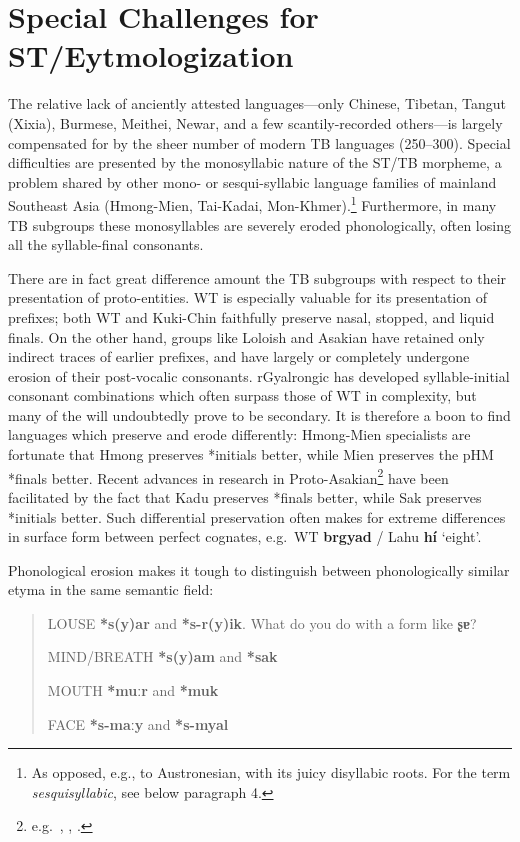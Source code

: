\section{Special Challenges for ST/Eytmologization}

The relative lack of anciently attested languages—only Chinese, Tibetan, Tangut (Xixia), Burmese, Meithei, Newar, and a few scantily-recorded others—is largely compensated for by the sheer number of modern TB languages (250–300). Special difficulties are presented by the monosyllabic nature of the ST/TB morpheme, a problem shared by other mono- or sesqui-syllabic language families of mainland Southeast Asia (Hmong-Mien, Tai-Kadai, Mon-Khmer).\footnote{As opposed, e.g., to Austronesian, with its juicy disyllabic roots. For the term \textit{sesquisyllabic}, see below paragraph 4.}
Furthermore, in many TB subgroups these monosyllables are severely eroded phonologically, often losing all the syllable-final consonants.

There are in fact great difference amount the TB subgroups with respect to their presentation of proto-entities. WT is especially valuable for its presentation of prefixes; both WT and Kuki-Chin faithfully preserve nasal, stopped, and liquid finals. On the other hand, groups like Loloish and Asakian have retained only indirect traces of earlier prefixes, and have largely or completely undergone erosion of their post-vocalic consonants.
rGyalrongic has developed syllable-initial consonant combinations which often surpass those of WT in complexity, but many of the will undoubtedly prove to be secondary.
It is therefore a boon to find languages which preserve and erode differently: Hmong-Mien specialists are fortunate that Hmong preserves *initials better, while Mien preserves the pHM *finals better.
Recent advances in research in Proto-Asakian\footnote{e.g.\ \citealt{HK-Sak}, \citealt{DS-Kadu}, \citealt{JAM-RGPJ}.} have been facilitated by the fact that Kadu preserves *finals better, while Sak preserves *initials better.
Such differential preservation often makes for extreme differences in surface form between perfect cognates, e.g.\ WT \textbf{brgyad} / Lahu \textbf{hí} ‘eight’.

Phonological erosion makes it tough to distinguish between phonologically similar etyma in the same semantic field:

\begin{quote}
LOUSE \textbf{*s(y)ar} and \textbf{*s-r(y)ik}. What do you do with a form like \textbf{ʂɐ}?

MIND/BREATH \textbf{*s(y)am} and \textbf{*sak}

MOUTH \textbf{*muːr} and \textbf{*muk}

FACE \textbf{*s-maːy} and \textbf{*s-myal}
\end{quote}

